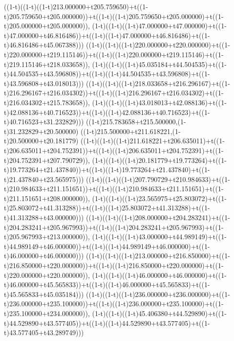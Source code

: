 ((1-t)((1-t)((1-t)213.000000+t205.759650)+t((1-t)205.759650+t205.000000))+t((1-t)((1-t)205.759650+t205.000000)+t((1-t)205.000000+t205.000000)),                                     (1-t)((1-t)((1-t)47.000000+t47.000000)+t((1-t)47.000000+t46.816486))+t((1-t)((1-t)47.000000+t46.816486)+t((1-t)46.816486+t45.067388)))
((1-t)((1-t)((1-t)220.000000+t220.000000)+t((1-t)220.000000+t219.115146))+t((1-t)((1-t)220.000000+t219.115146)+t((1-t)219.115146+t218.033658)),                                     (1-t)((1-t)((1-t)45.035184+t44.504535)+t((1-t)44.504535+t43.596808))+t((1-t)((1-t)44.504535+t43.596808)+t((1-t)43.596808+t43.018013)))
((1-t)((1-t)((1-t)218.033658+t216.296167)+t((1-t)216.296167+t216.034302))+t((1-t)((1-t)216.296167+t216.034302)+t((1-t)216.034302+t215.783658)),                                     (1-t)((1-t)((1-t)43.018013+t42.088136)+t((1-t)42.088136+t40.716523))+t((1-t)((1-t)42.088136+t40.716523)+t((1-t)40.716523+t31.232829)))
((1-t)215.783658+t215.500000,(1-t)31.232829+t20.500000)
((1-t)215.500000+t211.618221,(1-t)20.500000+t20.181779)
((1-t)((1-t)((1-t)211.618221+t206.635011)+t((1-t)206.635011+t204.752391))+t((1-t)((1-t)206.635011+t204.752391)+t((1-t)204.752391+t207.790729)),                                     (1-t)((1-t)((1-t)20.181779+t19.773264)+t((1-t)19.773264+t21.437840))+t((1-t)((1-t)19.773264+t21.437840)+t((1-t)21.437840+t23.565975)))
((1-t)((1-t)((1-t)207.790729+t210.984633)+t((1-t)210.984633+t211.151651))+t((1-t)((1-t)210.984633+t211.151651)+t((1-t)211.151651+t208.000000)),                                     (1-t)((1-t)((1-t)23.565975+t25.803072)+t((1-t)25.803072+t41.313288))+t((1-t)((1-t)25.803072+t41.313288)+t((1-t)41.313288+t43.000000)))
((1-t)((1-t)((1-t)208.000000+t204.283241)+t((1-t)204.283241+t205.967993))+t((1-t)((1-t)204.283241+t205.967993)+t((1-t)205.967993+t213.000000)),                                     (1-t)((1-t)((1-t)43.000000+t44.989149)+t((1-t)44.989149+t46.000000))+t((1-t)((1-t)44.989149+t46.000000)+t((1-t)46.000000+t46.000000)))
((1-t)((1-t)((1-t)213.000000+t216.850000)+t((1-t)216.850000+t220.000000))+t((1-t)((1-t)216.850000+t220.000000)+t((1-t)220.000000+t220.000000)),                                     (1-t)((1-t)((1-t)46.000000+t46.000000)+t((1-t)46.000000+t45.565833))+t((1-t)((1-t)46.000000+t45.565833)+t((1-t)45.565833+t45.035184)))
((1-t)((1-t)((1-t)236.000000+t236.000000)+t((1-t)236.000000+t235.100000))+t((1-t)((1-t)236.000000+t235.100000)+t((1-t)235.100000+t234.000000)),                                     (1-t)((1-t)((1-t)45.406380+t44.529890)+t((1-t)44.529890+t43.577405))+t((1-t)((1-t)44.529890+t43.577405)+t((1-t)43.577405+t43.289749)))
